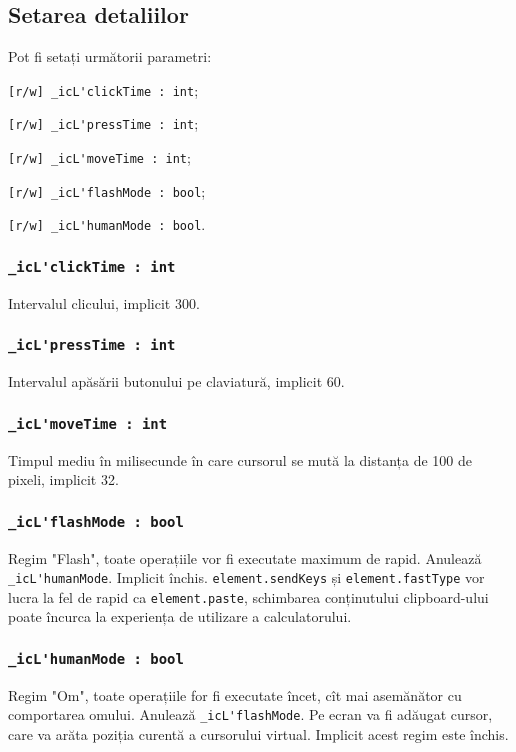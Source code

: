 \subsection{Setarea detaliilor}

Pot fi setați următorii parametri:
\begin{icItems}
	\item \lstinline|[r/w] _icL'clickTime : int|;
	\item \lstinline|[r/w] _icL'pressTime : int|;
	\item \lstinline|[r/w] _icL'moveTime : int|;
	\item \lstinline|[r/w] _icL'flashMode : bool|;
	\item \lstinline|[r/w] _icL'humanMode : bool|.
\end{icItems}

\subsubsection{\lstinline|_icL'clickTime : int|}

Intervalul clicului, implicit 300.

\subsubsection{\lstinline|_icL'pressTime : int|}

Intervalul apăsării butonului pe claviatură, implicit 60.

\subsubsection{\lstinline|_icL'moveTime : int|}

Timpul mediu în milisecunde în care cursorul se mută la distanța de 100 de pixeli, implicit 32.

\subsubsection{\lstinline|_icL'flashMode : bool|}

Regim "Flash", toate operațiile vor fi executate maximum de rapid. Anulează \lstinline|_icL'humanMode|. Implicit închis. \lstinline|element.sendKeys| și \lstinline|element.fastType| vor lucra la fel de rapid ca \lstinline|element.paste|, schimbarea conținutului clipboard-ului poate încurca la experiența de utilizare a calculatorului.

\subsubsection{\lstinline|_icL'humanMode : bool|}

Regim "Om", toate operațiile for fi executate încet, cît mai asemănător cu comportarea omului. Anulează \lstinline|_icL'flashMode|. Pe ecran va fi adăugat cursor, care va arăta poziția curentă a cursorului virtual. Implicit acest regim este închis.

